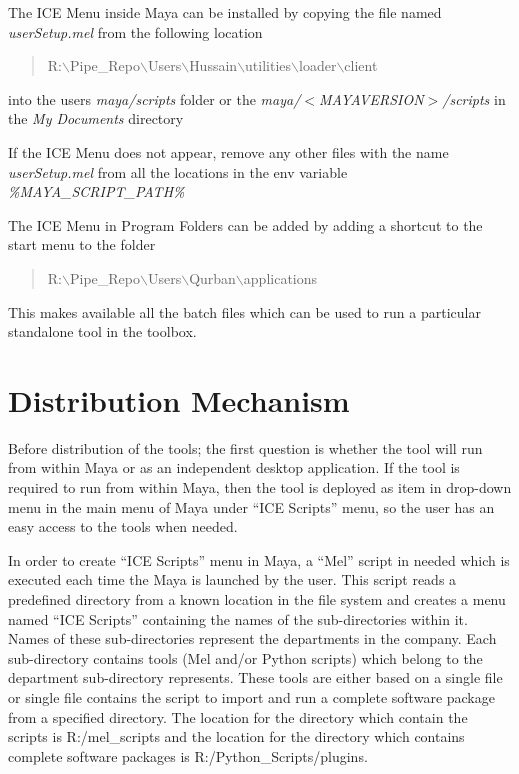 The ICE Menu inside Maya can be installed by copying the file named
\emph{userSetup.mel} from the following location 
\begin{quote}
R:$\backslash$Pipe\_Repo$\backslash$Users$\backslash$Hussain$\backslash$utilities$\backslash$loader$\backslash$client
\end{quote}
into the users \emph{maya/scripts} folder or the
\emph{maya/$<$MAYAVERSION$>$/scripts} in the \emph{My Documents} directory

If the ICE Menu does not appear, remove any other files with the name
\emph{userSetup.mel} from all the locations in the env variable
\emph{\%MAYA\_SCRIPT\_PATH\%}

The ICE Menu in Program Folders can be added by adding a shortcut to the
start menu to the folder

\begin{quote}
R:$\backslash$Pipe\_Repo$\backslash$Users$\backslash$Qurban$\backslash$applications
\end{quote}

This makes available all the batch files which can be used to run a particular
standalone tool in the toolbox.


\section{Distribution Mechanism}

Before distribution of the tools; the first question is whether the tool will
run from within Maya or as an independent desktop application. If the tool is
required to run from within Maya, then the tool is deployed as item in
drop-down menu in the main menu of Maya under “ICE Scripts” menu, so the user
has an easy access to the tools when needed.

In order to create “ICE Scripts” menu in Maya, a “Mel” script in needed which
is executed each time the Maya is launched by the user. This script reads a
predefined directory from a known location in the file system and creates a
menu named “ICE Scripts” containing the names of the sub-directories within
it. Names of these sub-directories represent the departments in the company.
Each sub-directory contains tools (Mel and/or Python scripts) which belong to
the department sub-directory represents. These tools are either based on a
single file or single file contains the script to import and run a complete
software package from a specified directory. The location for the directory
which contain the scripts is R:/mel\_scripts and the location for the directory
which contains complete software packages is R:/Python\_Scripts/plugins.

